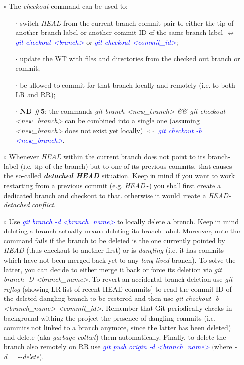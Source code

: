\documentclass[a4paper,portrait,10pt]{article}   %
\newcommand{\mydiv}{$\Leftrightarrow$ }   %
\newcommand{\mycmd}[1]{\textcolor{blue}{\textit{#1}}}   %
\newcommand{\myvspace}{\vspace{4mm}}   %
\begin{document}
\begin{itemize}
\item[$\circ$] The \textit{checkout} command can be used to:
\begin{itemize}
  \item[$\cdot$] switch \textit{HEAD} from the current branch-commit pair to either the tip of another branch-label or another commit ID of the same branch-label \mydiv \mycmd{git checkout <branch>} or \mycmd{git checkout <commit\_id>};
  \item[$\cdot$] update the WT with files and directories from the checked out branch or commit;
  \item[$\cdot$] be allowed to commit for that branch locally and remotely (i.e. to both LR and RR);
  \item[$\cdot$] \textbf{NB \#5}: the commands \textit{git branch <new\_branch> \&\& git checkout <new\_branch>} can be combined into a single one (assuming \textit{<new\_branch>} does not exist yet locally) \mydiv \mycmd{git checkout -b <new\_branch>}.
\end{itemize}
\myvspace

\item[$\circ$] Whenever \textit{HEAD} within the current branch does not point to its branch-label (i.e. tip of the branch) but to one of its previous commits, that causes the so-called \textbf{\textit{detached HEAD}} situation. Keep in mind if you want to work restarting from a previous commit (e.g. \textit{HEAD\textasciitilde}) you shall first create a dedicated branch and checkout to that, otherwise it would create a \textit{HEAD-detached conflict}.
\myvspace

\item[$\circ$] Use \mycmd{git branch -d <branch\_name>} to locally delete a branch. Keep in mind deleting a branch actually means deleting its branch-label. Moreover, note the command fails if the branch to be deleted is the one currently pointed by \textit{HEAD} (thus checkout to another first) or is \textit{dangling} (i.e. it has commits which have not been merged back yet to any \textit{long-lived} branch). To solve the latter, you can decide to either merge it back or force its deletion via \textit{git branch -D <branch\_name>}. To revert an accidental branch deletion use \textit{git reflog} (showing LR list of recent HEAD commits) to read the commit ID of the deleted dangling branch to be restored and then use \textit{git checkout -b <branch\_name> <commit\_id>}. Remember that Git periodically checks in background withing the project the presence of dangling commits (i.e. commits not linked to a branch anymore, since the latter has been deleted) and delete (aka \textit{garbage collect}) them automatically. Finally, to delete the branch also remotely on RR use \mycmd{git push origin -d <branch\_name>} (where \textit{-d} = \textit{-{}-delete}).
\end{itemize}
\myvspace
\end{document}

